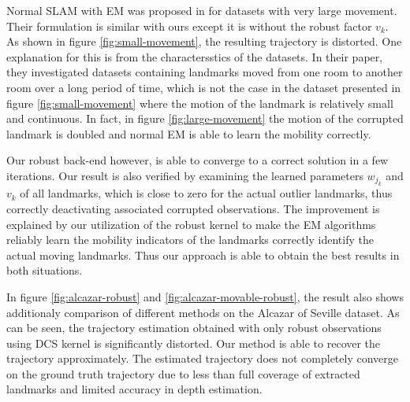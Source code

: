 Normal SLAM with EM was proposed in \cite{rogers2010slam} for datasets with
very large movement. Their formulation is similar with ours except it is
without the robust factor $v_k$.  As shown in figure \ref{fig:small-movement},
the resulting trajectory is distorted. One explanation for this is from the
charactersstics of the datasets.  In their paper, they investigated datasets
containing landmarks moved from one room to another room over a long period of
time, which is not the case in the dataset presented in figure
\ref{fig:small-movement} where the motion of the landmark is relatively small
and continuous. In fact, in figure \ref{fig:large-movement} the motion of the
corrupted landmark is doubled and normal EM is able to learn the mobility
correctly.

Our robust back-end however, is able to converge to a correct solution in a few
iterations. Our result is also verified by examining the learned parameters
$w_{j_k}$ and $v_k$ of all landmarks, which is close to zero for the actual
outlier landmarks, thus correctly deactivating associated corrupted
observations.  The improvement is explained by our utilization of the robust
kernel to make the EM algorithms reliably learn the mobility indicators of the
landmarks correctly identify the actual moving landmarks. Thus our approach is
able to obtain the best results in both situations.

In figure \ref{fig:alcazar-robust} and \ref{fig:alcazar-movable-robust}, the
result also shows additionaly comparison of different methods on the Alcazar of
Seville dataset. As can be seen, the trajectory estimation obtained with only
robust observations using DCS kernel is significantly distorted. Our method is
able to recover the trajectory approximately. The estimated trajectory does not
completely converge on the ground truth trajectory due to less than full
coverage of extracted landmarks and limited accuracy in depth estimation.

